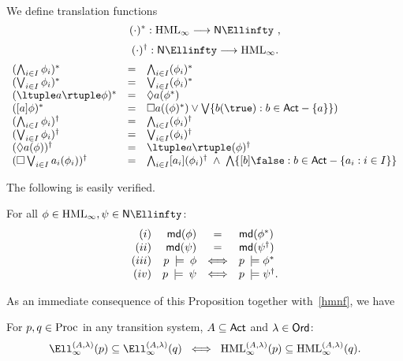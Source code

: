 \begin{definition}
\label{tfuns}
{\rm We define translation functions}
\[ ( \cdot )^{\ast} : {\rm HML}_{\infty} \longrightarrow {\sf N} \Ellinfty\ , \]
\[ ( \cdot )^{\dagger} : {\sf N} \Ellinfty  \longrightarrow {\rm HML}_{\infty} . \]
\[ \begin{array}{lll}
( \bigwedge_{i \in I} \phi_{i})^{\ast} & = & \bigwedge_{i \in I} (\phi_{i})^{\ast} \\
( \bigvee_{i \in I} \phi_{i})^{\ast} & = & \bigvee_{i \in I} (\phi_{i})^{\ast} \\
( \ltuple a \rtuple \phi )^{\ast} & = & \Diamond a(\phi^{\ast}) \\
( [ a ] \phi )^{\ast} & = & \Box  a((\phi )^{\ast}) \vee \bigvee \{ b(\true ) : b \in {\sf Act} - \{ a \} \} ) \\
( \bigwedge_{i \in I} \phi_{i})^{\dagger} & = & \bigwedge_{i \in I} (\phi_{i})^{\dagger} \\
( \bigvee_{i \in I} \phi_{i})^{\dagger} & = & \bigvee_{i \in I} (\phi_{i})^{\dagger} \\
( \Diamond a(\phi ))^{\dagger} & = &  \ltuple a \rtuple (\phi )^{\dagger} \\
( \Box \bigvee_{i \in I} a_{i}(\phi_{i}))^{\dagger} & = & \bigwedge_{i \in I} [ a_{i} ] (\phi_{i})^{\dagger} \; \wedge \; \bigwedge \{ [ b ] \false : b \in {\sf Act} - \{ a_{i} : i \in I \} \}
\end{array} \]
\end{definition}
The following is easily verified.
\begin{proposition}
\label{faitht}
For all $\phi \in {\rm HML}_{\infty}, \psi \in {\sf N} \Ellinfty$:
\[ \begin{array}{rrcl}
(i) & {\sf md}(\phi ) & = & {\sf md}(\phi^{\ast}) \\
(ii) & {\sf md}(\psi ) & = & {\sf md}(\psi^{\dagger}) \\
(iii) & p \: \models \: \phi & \Longleftrightarrow & p \: \models \phi^{\ast} \\
(iv) &  p \: \models \: \psi & \Longleftrightarrow & p \: \models \psi^{\dagger} .
\end{array} \]
\end{proposition}

As an immediate consequence of this Proposition together with~\ref{hmnf}, we have

\begin{theorem}
For $p, q \in {\rm Proc}$ in any transition system,  $A \subseteq {\sf Act}$ and $\lambda \in {\sf Ord}$:
\[ \Ell^{(A, \lambda )}_{\infty}(p) \subseteq \Ell^{(A, \lambda )}_{\infty}(q) \;\; \Longleftrightarrow \;\; {\rm HML}^{(A, \lambda )}_{\infty}(p) \subseteq {\rm HML}^{(A, \lambda )}_{\infty}(q) . \]
\end{theorem}

